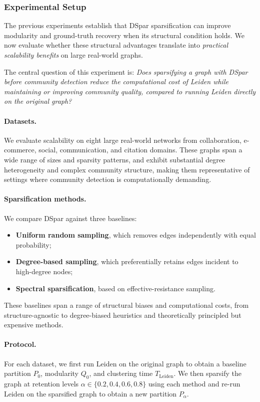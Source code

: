\documentclass[10pt,journal,compsoc]{IEEEtran}
\begin{document}
\subsubsection{Experimental Setup}

The previous experiments establish that DSpar sparsification can improve modularity and ground-truth recovery when its structural condition holds.
We now evaluate whether these structural advantages translate into \emph{practical scalability benefits} on large real-world graphs.

The central question of this experiment is:
\emph{Does sparsifying a graph with DSpar before community detection reduce the computational cost of Leiden while maintaining or improving community quality, compared to running Leiden directly on the original graph?}

\paragraph{Datasets.}
We evaluate scalability on eight large real-world networks from collaboration, e-commerce, social, communication, and citation domains. These graphs span a wide range of sizes and sparsity patterns, and exhibit substantial degree heterogeneity and complex community structure, making them representative of settings where community detection is computationally demanding.

\paragraph{Sparsification methods.}
We compare DSpar against three baselines:
\begin{itemize}
  \item \textbf{Uniform random sampling}, which removes edges independently with equal probability;
  \item \textbf{Degree-based sampling}, which preferentially retains edges incident to high-degree nodes;
  \item \textbf{Spectral sparsification}, based on effective-resistance sampling.
\end{itemize}
These baselines span a range of structural biases and computational costs, from structure-agnostic to degree-biased heuristics and theoretically principled but expensive methods.

\paragraph{Protocol.}
For each dataset, we first run Leiden on the original graph to obtain a baseline partition $P_0$, modularity $Q_0$, and clustering time $T_{\mathrm{Leiden}}$.
We then sparsify the graph at retention levels $\alpha \in \{0.2, 0.4, 0.6, 0.8\}$ using each method and re-run Leiden on the sparsified graph to obtain a new partition $P_\alpha$.
\end{document}
